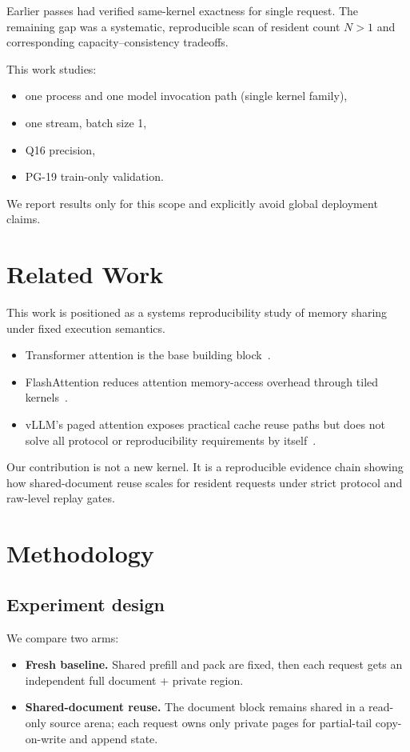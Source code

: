 \documentclass{article}
\begin{document}
Earlier passes had verified same-kernel exactness for single request. The remaining gap was a systematic, reproducible scan of resident count $N>1$ and corresponding capacity--consistency tradeoffs.

This work studies:
\begin{itemize}
  \item one process and one model invocation path (single kernel family),
  \item one stream, batch size 1,
  \item Q16 precision,
  \item PG-19 train-only validation.
\end{itemize}

We report results only for this scope and explicitly avoid global deployment claims.

\section{Related Work}
This work is positioned as a systems reproducibility study of memory sharing under fixed execution semantics.
\begin{itemize}
  \item Transformer attention is the base building block~\citep{vaswani2017attention}.
  \item FlashAttention reduces attention memory-access overhead through tiled kernels~\citep{dao2022flashattention}.
  \item vLLM's paged attention exposes practical cache reuse paths but does not solve all protocol or reproducibility requirements by itself~\citep{vllm2024pagedattention}.
\end{itemize}

Our contribution is not a new kernel. It is a reproducible evidence chain showing how shared-document reuse scales for resident requests under strict protocol and raw-level replay gates.

\section{Methodology}
\subsection{Experiment design}
We compare two arms:
\begin{itemize}
  \item \textbf{Fresh baseline.} Shared prefill and pack are fixed, then each request gets an independent full document + private region.
  \item \textbf{Shared-document reuse.} The document block remains shared in a read-only source arena; each request owns only private pages for partial-tail copy-on-write and append state.
\end{itemize}
\end{document}
